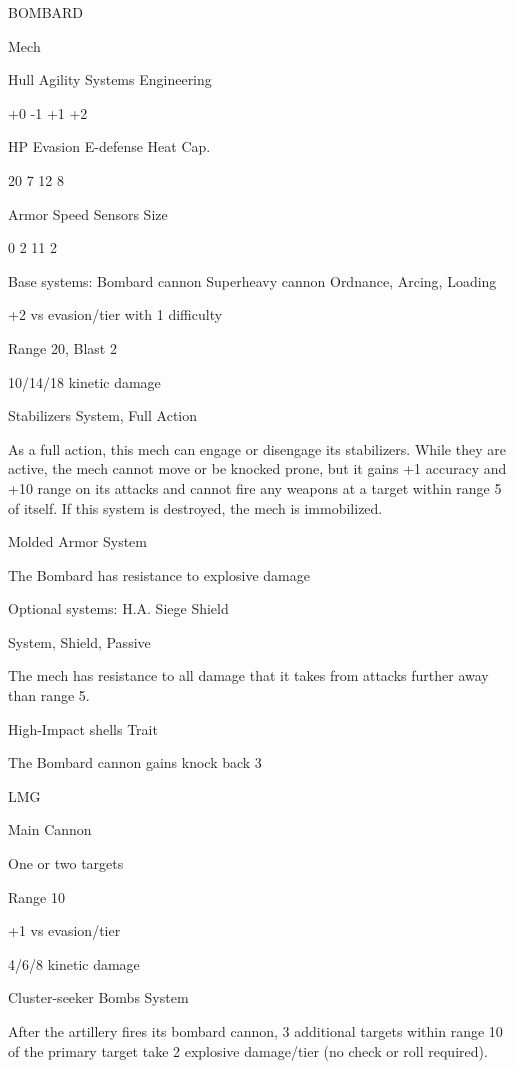        BOMBARD 

       Mech 

       Hull      Agility     Systems       Engineering 

       +0        -1          +1            +2 

       HP        Evasion     E-defense     Heat Cap. 

       20        7            12           8 

      Armor      Speed       Sensors       Size 

       0         2            11           2 

Base systems:  
Bombard cannon  
Superheavy cannon  
Ordnance, Arcing, Loading
 
+2 vs evasion/tier with 1 difficulty
 
Range 20, Blast 2
 
10/14/18 kinetic damage
 

Stabilizers  
System, Full Action
 
As a full action, this mech can engage or disengage its stabilizers. While they are active, the  
mech cannot move or be knocked prone, but it gains +1 accuracy and +10 range on its attacks  
and cannot fire any weapons at a target within range 5 of itself. If this system is destroyed, the  
mech is immobilized.
 

Molded Armor  
System
 
The Bombard has resistance to explosive damage
 

Optional systems:  
H.A. Siege Shield  

                                                                                                       


System, Shield, Passive
 
The mech has resistance to all damage that it takes from attacks further away than range 5.
 

High-Impact shells  
Trait
 
The Bombard cannon gains knock back 3
 

LMG
 
Main Cannon
 
One or two targets
 
Range 10
 
+1 vs evasion/tier
 
4/6/8 kinetic damage
 

Cluster-seeker Bombs  
System
 
After the artillery fires its bombard cannon, 3 additional targets within range 10 of the primary  
target take 2 explosive damage/tier (no check or roll required).
 

